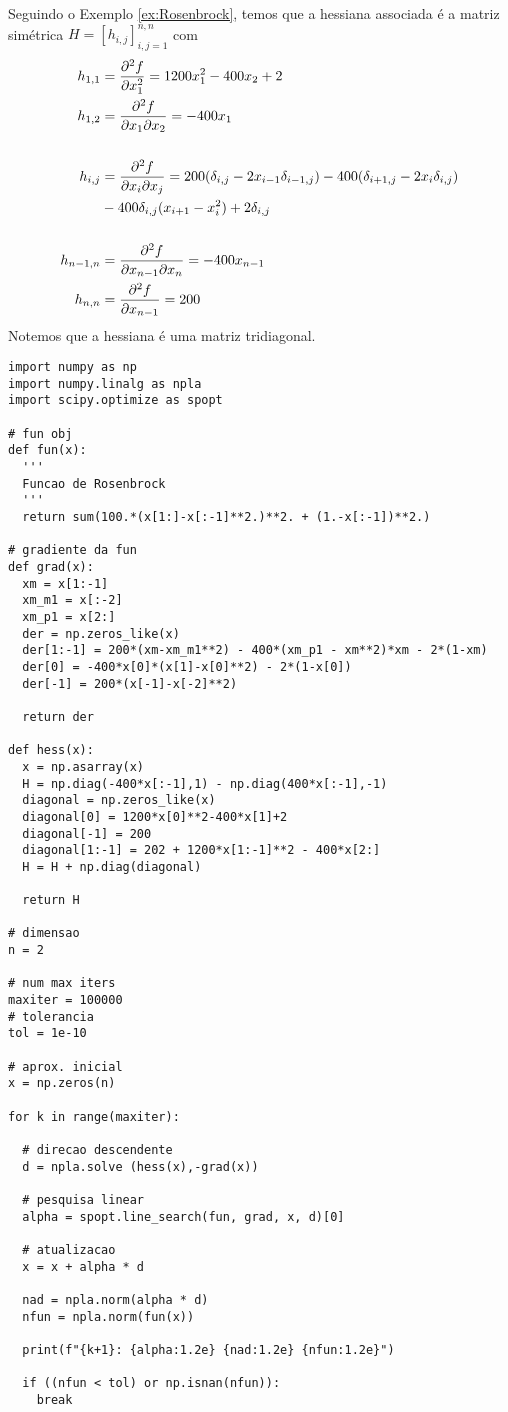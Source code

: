 \begin{ex}\label{ex:optNewtonGC}
  Seguindo o Exemplo \ref{ex:Rosenbrock}, temos que a hessiana associada é a matriz simétrica $H = [h_{i,j}]_{i,j=1}^{n,n}$ com
  \begin{align}
    h_{1,1} &= \frac{\partial^2 f}{\partial x_1^2} = 1200x_1^2-400x_2+2\\
    h_{1,2} &= \frac{\partial^2 f}{\partial x_1\partial x_2} = -400x_1\\
            &~\nonumber\\
    h_{i,j} &= \frac{\partial^2 f}{\partial x_i\partial x_j} = 200(\delta_{i,j}-2x_{i-1}\delta_{i-1,j}) - 400(\delta_{i+1,j}-2x_i\delta_{i,j})\nonumber\\
            &- 400\delta_{i,j}(x_{i+1}-x_i^2) + 2\delta_{i,j}\\
            &~\nonumber\\
    h_{n-1,n} &= \frac{\partial^2 f}{\partial x_{n-1}\partial x_n} = -400x_{n-1}\\
    h_{n,n} &= \frac{\partial^2 f}{\partial x_{n-1}} = 200
  \end{align}
  Notemos que a hessiana é uma matriz tridiagonal.

\begin{lstlisting}
import numpy as np
import numpy.linalg as npla
import scipy.optimize as spopt

# fun obj
def fun(x):
  '''
  Funcao de Rosenbrock
  '''
  return sum(100.*(x[1:]-x[:-1]**2.)**2. + (1.-x[:-1])**2.)

# gradiente da fun
def grad(x):
  xm = x[1:-1]
  xm_m1 = x[:-2]
  xm_p1 = x[2:]
  der = np.zeros_like(x)
  der[1:-1] = 200*(xm-xm_m1**2) - 400*(xm_p1 - xm**2)*xm - 2*(1-xm)
  der[0] = -400*x[0]*(x[1]-x[0]**2) - 2*(1-x[0])
  der[-1] = 200*(x[-1]-x[-2]**2)
  
  return der

def hess(x):
  x = np.asarray(x)
  H = np.diag(-400*x[:-1],1) - np.diag(400*x[:-1],-1)
  diagonal = np.zeros_like(x)
  diagonal[0] = 1200*x[0]**2-400*x[1]+2
  diagonal[-1] = 200
  diagonal[1:-1] = 202 + 1200*x[1:-1]**2 - 400*x[2:]
  H = H + np.diag(diagonal)

  return H

# dimensao
n = 2

# num max iters
maxiter = 100000
# tolerancia
tol = 1e-10

# aprox. inicial
x = np.zeros(n)

for k in range(maxiter):

  # direcao descendente
  d = npla.solve (hess(x),-grad(x))

  # pesquisa linear
  alpha = spopt.line_search(fun, grad, x, d)[0]

  # atualizacao
  x = x + alpha * d

  nad = npla.norm(alpha * d)
  nfun = npla.norm(fun(x))

  print(f"{k+1}: {alpha:1.2e} {nad:1.2e} {nfun:1.2e}")

  if ((nfun < tol) or np.isnan(nfun)):
    break  
\end{lstlisting}

\end{ex}

